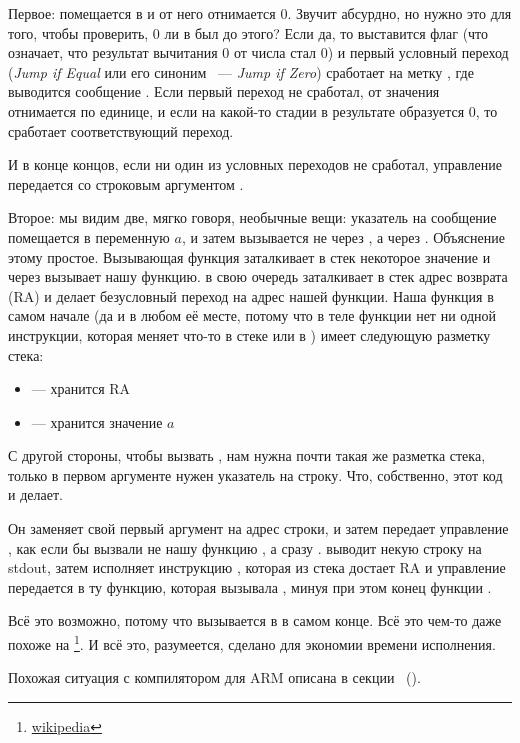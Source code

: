 Первое:  помещается в \EAX и от него отнимается 0. Звучит абсурдно, но нужно это для того, чтобы проверить, 
0 ли в \EAX был до этого? Если да, то выставится флаг \ZF (что означает, что результат вычитания 0 от числа 
стал 0) и первый условный переход \JE (\emph{Jump if Equal} или его синоним \JZ~--- \emph{Jump if Zero}) 
сработает на метку , где выводится сообщение .
Если первый переход не сработал, от значения отнимается по единице, 
и если на какой-то стадии в результате образуется 0, то сработает соответствующий переход.

И в конце концов, если ни один из условных переходов не сработал, управление передается \printf
со строковым аргументом .

\label{jump_to_last_printf}
\myindex{\Stack}
Второе: мы видим две, мягко говоря, необычные вещи: указатель на сообщение помещается в переменную $a$, 
и затем \printf вызывается не через \CALL, а через \JMP. Объяснение этому простое. 
Вызывающая функция заталкивает в стек некоторое значение и через \CALL вызывает нашу функцию. 
\CALL в свою очередь заталкивает в стек адрес возврата (\ac{RA}) и делает безусловный переход на адрес нашей функции. 
Наша функция в самом начале (да и в любом её месте, потому что в теле функции нет ни одной инструкции, 
которая меняет что-то в стеке или в \ESP) имеет следующую разметку стека:

\begin{itemize}
\item\ESP --- хранится \ac{RA}
\item{} --- хранится значение $a$ 
\end{itemize}

С другой стороны, чтобы вызвать \printf, нам нужна почти такая же разметка стека, 
только в первом аргументе нужен указатель на строку. Что, собственно, этот код и делает.

Он заменяет свой первый аргумент на адрес строки, и затем передает управление \printf, как если бы вызвали не 
нашу функцию \ttf, а сразу \printf. 
\printf выводит некую строку на \gls{stdout}, затем исполняет инструкцию \RET, 
которая из стека достает \ac{RA} и управление передается в ту функцию, 
которая вызывала \ttf, минуя при этом конец функции \ttf.

\newcommand{\URLSJ}{\href{http://go.yurichev.com/17121}{wikipedia}}
Всё это возможно, потому что \printf вызывается в \ttf в самом конце. 
Всё это чем-то даже похоже на \footnote{\URLSJ}.
И всё это, разумеется, сделано для экономии времени исполнения.

Похожая ситуация с компилятором для ARM описана в секции \q{\PrintfSeveralArgumentsSectionName}~().



